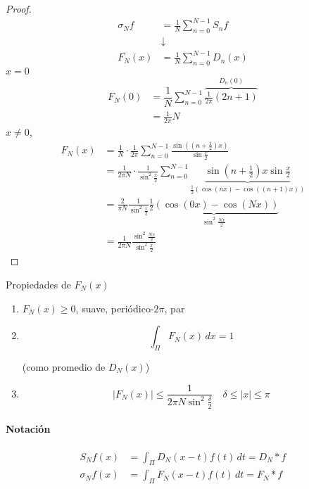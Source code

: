 \begin{proof}
    \begin{align*}
        \sigma_N f&=\frac{1}{N} \sum_{n=0}^{N-1} S_n f\\
        &\downarrow\\
        F_N(x)&=\frac{1}{N}\sum_{n=0}^{N-1} D_n(x)
    \end{align*}
    $x=0$
    \begin{align*}
        F_N(0)&=\dfrac{1}{N}\displaystyle\sum_{n=0}^{N-1} \overbrace{\frac{1}{2\pi} (2n+1)}^{D_n(0)}\\
        &=\frac{1}{2\pi} N
    \end{align*}
    $x\neq 0$,
    \begin{align*}
        F_N(x)&=\frac{1}{N}\cdot \frac{1}{2\pi} \sum_{n=0}^{N-1} \frac{\sin ((n+\frac{1}{2})x)}{\sin\frac{x}{2}}\\
        &=\frac{1}{2\pi N}\cdot \frac{1}{\sin^2 \frac{x}{2}}\sum_{n=0}^{N-1} \underbrace{\sin(n+\frac{1}{2})x\sin \frac{x}{2}}_{\frac{1}{2}\left(\cos(nx)-\cos((n+1)x)\right)}\\
        &=\frac{2}{\pi N}\frac{1}{\sin^2 \frac{x}{2}}\underbrace{\frac{1}{2}(\cos(0x)-\cos(Nx))}_{\sin^2 \frac{Nx}{2}}\\
        &=\frac{1}{2\pi N}\frac{\sin^2 \frac{Nx}{2}}{\sin^2\frac{x}{2}}
    \end{align*}
\end{proof}

Propiedades de $F_N(x)$

\begin{enumerate}
    \item $F_N(x)\geq 0$, suave, periódico-$2\pi$, par 
    \item \[\int_\Pi F_N(x)\,dx=1\]
    
    (como promedio de $D_N(x)$)

    \item \[|F_N(x)|\leq \frac{1}{2\pi N\sin^2 \frac{\delta}{2}}\quad \delta\leq |x|\leq \pi\]
\end{enumerate}


\paragraph{Notación}

\begin{align*}
    S_N f(x)&=\int_\Pi D_N(x-t)f(t)\,dt=D_N*f\\
    \sigma_N f(x)&=\int_\Pi F_N(x-t)f(t)\,dt=F_N*f
\end{align*}

